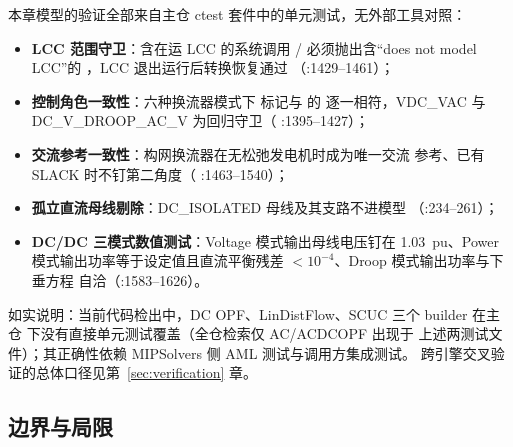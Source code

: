 本章模型的验证全部来自主仓 ctest 套件中的单元测试，无外部工具对照：
\begin{itemize}
  \item \textbf{LCC 范围守卫}：含在运 LCC 的系统调用 /
         必须抛出含“does not model LCC”的
        ，LCC 退出运行后转换恢复通过
        （:1429--1461）；
  \item \textbf{控制角色一致性}：六种换流器模式下
         标记与 
        的  逐一相符，VDC\_VAC 与
        DC\_V\_DROOP\_AC\_V 为回归守卫（
        :1395--1427）；
  \item \textbf{交流参考一致性}：构网换流器在无松弛发电机时成为唯一交流
        参考、已有 SLACK 时不钉第二角度（
        :1463--1540）；
  \item \textbf{孤立直流母线剔除}：DC\_ISOLATED 母线及其支路不进模型
        （:234--261）；
  \item \textbf{DC/DC 三模式数值测试}：Voltage 模式输出母线电压钉在
        1.03~pu、Power 模式输出功率等于设定值且直流平衡残差
        $<10^{-4}$、Droop 模式输出功率与下垂方程
        自洽（:1583--1626）。
\end{itemize}
如实说明：当前代码检出中，DC OPF、LinDistFlow、SCUC 三个 builder 在主仓
 下没有直接单元测试覆盖（全仓检索仅 AC/ACDCOPF 出现于
上述两测试文件）；其正确性依赖 MIPSolvers 侧 AML 测试与调用方集成测试。
跨引擎交叉验证的总体口径见第~\ref{sec:verification} 章。

\subsection{边界与局限}

